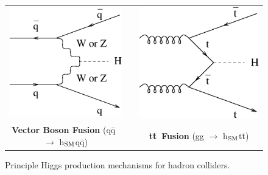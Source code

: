\documentclass[12pt]{article}
\def\qqbar{q\={q}}
\def\ttbar{t\={t}}
\begin{document}
\begin{figure}[p]
\begin{center}
\begin{tabular}[t]{c p{0.5cm} c}
      \includegraphics[scale=0.5]{production_vector_boson_fusion.eps} & &
      \includegraphics[scale=0.5]{production_tt_fusion.eps} \\
      {\bf Vector Boson Fusion} (\qqbar\ $\to$ h$_{\mbox{\scriptsize SM}}$\qqbar) & &
      {\bf \ttbar\ Fusion} (gg $\to$ h$_{\mbox{\scriptsize SM}}$\ttbar) \\
    \end{tabular}
  \end{center}

  \caption{Principle Higgs production mechanisms for hadron
  colliders.}

  \label{fig:production}
\end{figure}
\end{document}
